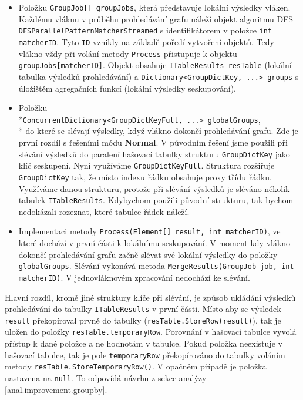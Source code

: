 \begin{itemize}

\item Položku \texttt{GroupJob[] groupJobs}, která představuje lokální výsledky vláken.
Každému vláknu v průběhu prohledávání grafu náleží objekt algoritmu DFS \texttt{DFSParallelPatternMatcherStreamed} s identifikátorem v položce \texttt{int matcherID}.
Tyto \texttt{ID} vznikly na základě poředí vytvoření objektů. 
Tedy vlákno vždy při volání metody \texttt{Process} přistupuje k objektu \texttt{groupJobs[matcherID]}.
Objekt obsahuje \texttt{ITableResults resTable} (lokální tabulka výsledků prohledávání) a \texttt{Dictionary<GroupDictKey, ...> groups} s úložištěm agregačních funkcí (lokální výsledky seskupování).

\item Položku \\*\texttt{ConcurrentDictionary<GroupDictKeyFull, ...> globalGroups},\\* do které se slévají výsledky, když vlákno dokončí prohledávání grafu.
Zde je první rozdíl s řešeními módu \textbf{Normal}.
V původním řešení jsme použili při slévání výsledků do paralení hašovací tabulky strukturu \texttt{GroupDictKey} jako klíč seskupení.
Nyní využíváme \texttt{GroupDictKeyFull}.
Struktura rozšiřuje \texttt{GroupDictKey} tak, že místo indexu řádku obsahuje proxy třídu řádku.
Využíváme danou strukturu, protože při slévání výsledků je sléváno několik tabulek \texttt{ITableResults}.
Kdybychom použili původní strukturu, tak bychom nedokázali rozeznat, které tabulce řádek náleží.

\item Implementaci metody \texttt{Process(Element[] result, int matcherID)}, ve které dochází v první části k lokálnímu seskupování.
V moment kdy vlákno dokončí prohledávání grafu začně slévat své lokální výsledky do položky \texttt{globalGroups}.
Slévání vykonává metoda \texttt{MergeResults(GroupJob job, int matcherID)}.
V jednovláknovém zpracování nedochází ke slévání.
\end{itemize}
Hlavní rozdíl, kromě jiné struktury klíče při slévání, je způsob ukládání výsledků prohledávání do tabulky \texttt{ITableResults} v první části.
Místo aby se výsledek \texttt{result} překopíroval prvně do tabulky (\texttt{resTable.StoreRow(result)}), tak je uložen do položky \texttt{resTable.temporaryRow}.
Porovnání v hašovací tabulce vyvolá přístup k dané položce a ne hodnotám v tabulce.
Pokud položka neexistuje v hašovací tabulce, tak je pole \texttt{temporaryRow} překopírováno do tabulky voláním metody \texttt{resTable.StoreTemporaryRow()}.
V opačném případě je položka nastavena na \texttt{null}. To odpovídá návrhu z sekce analýzy \ref{anal.improvement.groupby}. 


